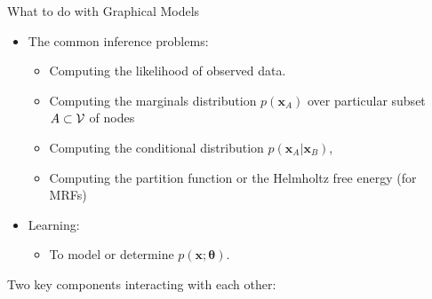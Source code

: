 \begin{frame}{What to do with Graphical Models}
  \begin{itemize}[label={$\bullet$}]
  \item The common inference problems:
    \begin{itemize}[label={$\bullet$}]
    \item Computing the likelihood of observed data.
    \item Computing the marginals distribution $p(\bm{x}_A)$ over particular subset $A \subset \mathcal{V}$ of nodes
    \item Computing the conditional distribution $p(\bm{x}_A | \bm{x}_{B})$, 
    \item Computing the partition function or the Helmholtz free energy (for MRFs)
    \end{itemize}
  \item Learning:
    \begin{itemize}[label=$\bullet$]
    \item To model or determine $p(\bm{x}; \bm{\theta})$.
    \end{itemize}
  \end{itemize}
  

  
  Two key components interacting with each other:
  \begin{figure}[!t]
    \centering

  \end{figure}
  

\end{frame}











